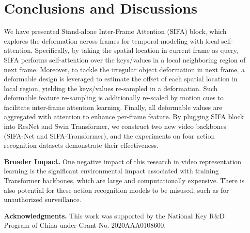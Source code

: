 \documentclass[10pt,twocolumn,letterpaper]{article}
\begin{document}
\section{Conclusions and Discussions}
We have presented Stand-alone Inter-Frame Attention (SIFA) block, which explores the deformation across frames for temporal modeling with local self-attention.
Specifically, by taking the spatial location in current frame as query, SIFA performs self-attention over the keys/values in a local neighboring region of next frame.
Moreover, to tackle the irregular object deformation in next frame, a deformable design is leveraged to estimate the offset of each spatial location in local region, yielding the keys/values re-sampled in a deformation. Such deformable feature re-sampling is additionally re-scaled by motion cues to facilitate inter-frame attention learning. Finally, all deformable values are aggregated with attention to enhance per-frame feature. By plugging SIFA block into ResNet and Swin Transformer, we construct two new video backbones (SIFA-Net and SIFA-Transformer), and the experiments on four action recognition datasets demonstrate their effectiveness.

\textbf{Broader Impact.} One negative impact of this research in video representation learning is the significant environmental impact associated with training Transformer backbones, which are large and computationally expensive. There is also potential for these action recognition models to be misused, such as for unauthorized surveillance.

\textbf{Acknowledgments.} This work was supported by the National Key R\&D Program of China under Grant No. 2020AAA0108600.

{\small


}
\end{document}
